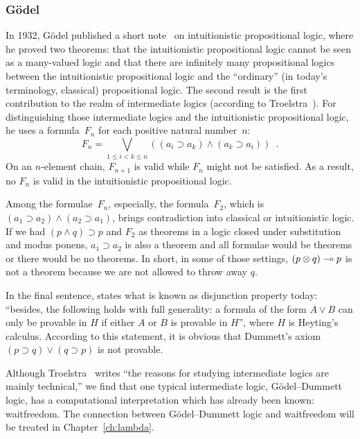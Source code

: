 \subsubsection{G\"odel}
In 1932, G\"odel published a short note~\cite{godelprop} on
intuitionistic propositional
logic, where he proved two theorems: that the intuitionistic propositional logic
cannot be seen as a many-valued logic and that
there are infinitely many propositional logics between the
intuitionistic propositional logic and the ``ordinary'' (in today's
terminology, classical) propositional logic.  The second result is the
first contribution to the realm of intermediate
logics (according to Troelstra~\cite[p.~223]{goedelcollected}).
For distinguishing those intermediate logics and the intuitionistic
propositional logic, he uses a formula~$F_n$ for each positive natural
number~$n$:
\[
 F_n = \bigvee_{1\le i < k\le n}\left((a_i\supset a_k) \land (a_k\supset a_i)\right)\enspace.
\]
On an $n$-element chain, $F_{n+1}$ is valid while $F_n$ might not be
satisfied.  As a result, no $F_n$ is valid in the intuitionistic
propositional logic.

Among the formulae~$F_n$,
especially, the formula~$F_2$, which is $(a_1\supset a_2)\land (a_2\supset
a_1)$, brings contradiction into classical or intuitionistic logic.  If we
had $(p\land q)\supset p$ and $F_2$ as theorems in a logic closed under
substitution and modus ponens,
$a_1\supset a_2$ is also a theorem and all formulae would be theorems or
there would be no theorems.
In short, in some of those settings, $(p\otimes q)\multimap p$ is
not a theorem because we are not allowed to throw away $q$.

In the final sentence, \citet{godelprop} states what is known as
disjunction property today: ``besides, the
following holds with full
generality: a formula of the form $A\lor B$ can only be provable in $H$
if either $A$ or $B$ is provable in $H$'', where $H$ is Heyting's calculus.
According to this statement, it is obvious that Dummett's axiom
$(p\supset q) \lor (q\supset p)$ is not provable.

Although Troelstra~\cite[p.~223]{goedelcollected} writes ``the reasons
for studying intermediate logics are mainly technical,'' we find that
one typical intermediate logic, G\"odel--Dummett logic, has a
computational interpretation which has already been known: waitfreedom.
The connection between G\"odel--Dummett logic and waitfreedom will be
treated in Chapter~\ref{ch:lambda}.

